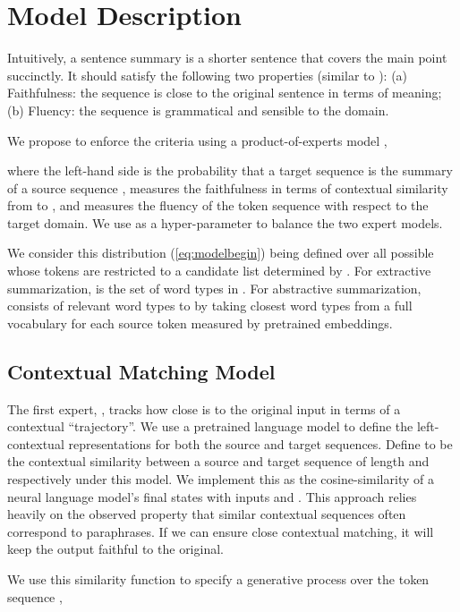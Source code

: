 \documentclass[11pt,a4paper]{article}
\begin{document}
\section{Model Description}
Intuitively, a sentence summary is a shorter sentence that covers the main point succinctly. 
It should satisfy the following two properties (similar to \citet{pitler2010methods}): 
(a) Faithfulness: the sequence is close to the original sentence in terms of meaning;
(b) Fluency: the sequence is grammatical and sensible to the domain.

We propose to enforce the criteria using a product-of-experts model \cite{hinton2002training},


\noindent where the left-hand side is the probability that a target sequence  is the summary of a source sequence ,  measures the faithfulness in terms of contextual similarity from  to , and  measures the fluency of the token sequence  with respect to the target domain. We use  as a hyper-parameter to balance the two expert models.



We consider this distribution (\ref{eq:modelbegin}) being defined over all possible  whose tokens are restricted to a candidate list  determined by . For extractive summarization,  is the set of word types in . For abstractive summarization,  consists of relevant word types to  
by taking  closest word types from a full vocabulary  for each source token measured by pretrained embeddings.

\subsection{Contextual Matching Model}

The first expert, , tracks how  close  is to the original input  in terms of a 
contextual ``trajectory''. We use a pretrained language model to define the left-contextual representations for both 
the source and target sequences. Define  to be the contextual similarity between a source and target sequence of length  and  respectively under this model. We implement this as the cosine-similarity of a neural language model's final states with inputs  and . This approach relies heavily on the observed property that similar contextual sequences often correspond to paraphrases. If we can ensure close contextual matching, it will keep the output faithful to the original.

We use this similarity function to specify a generative process over the token sequence ,
\end{document}
